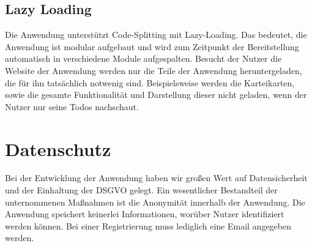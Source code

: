 \subsection{Lazy Loading}
Die Anwendung unterstützt Code-Splitting mit Lazy-Loading.
Das bedeutet, die Anwendung ist modular aufgebaut und wird zum Zeitpunkt der Bereitstellung automatisch in verschiedene Module aufgespalten.
Besucht der Nutzer die Website der Anwendung werden nur die Teile der Anwendung heruntergeladen, die für ihn tatsächlich notwenig sind.
Beispielsweise werden die Karteikarten, sowie die gesamte Funktionalität und Darstellung dieser nicht geladen, wenn der Nutzer nur seine Todos nachschaut.


\section{Datenschutz}
Bei der Entwicklung der Anwendung haben wir großen Wert auf Datensicherheit und der Einhaltung der DSGVO gelegt.
Ein wesentlicher Bestandteil der unternommenen Maßnahmen ist die Anonymität innerhalb der Anwendung.
Die Anwendung speichert keinerlei Informationen, worüber Nutzer identifiziert werden können.
Bei einer Registrierung muss lediglich eine Email angegeben werden.